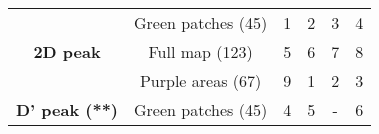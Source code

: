 \begin{table}[!h]
{{\begin{tabular}{cccccc}
\multirow{3}{*}{\textbf{2D peak}} & Green patches (45) & 1 & 2 & 3 & 4 \\
 & Full map (123) & 5 & 6 & 7 & 8 \\
 & Purple areas (67) & 9 & 1 & 2 & 3 \\

\rowcolor{Gray}\textbf{D' peak (**)} & Green patches (45) & 4 & 5 & - & 6 \\ 

\bottomrule

\end{tabular}
}
}
\end{table}


\clearpage
{}
\specialsection
\headerspecialsection

{\hypersetup{urlcolor=ntnu,linkcolor=sophia} %


}

